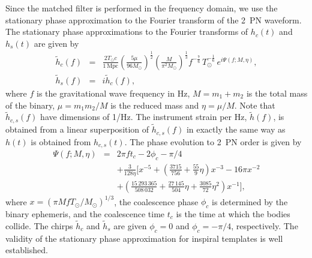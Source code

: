 Since the matched filter is performed in the frequency domain, we use the
stationary phase approximation to the Fourier transform of the 2~PN
waveform\cite{poissonwill}. The stationary phase approximations to the Fourier
transforms of $h_c(t)$ and $h_s(t)$ are given by
\begin{eqnarray}
\label{eq:spcos}
\tilde{h}_c(f)&=&\frac{2T_\odot c}{1\,\mathrm{Mpc}}
\left(\frac{5\mu}{96M_\odot}\right)^\frac{1}{2}
\left(\frac{M}{\pi^2M_\odot}\right)^\frac{1}{3}%
f^{-\frac{7}{6}}\,T_\odot^{-\frac{1}{6}}\,
e^{i\Psi(f;M,\eta)},\\%
\label{eq:hsorthog}
\tilde{h}_s(f)&=&i\tilde{h}_c(f),
\end{eqnarray}
where $f$ is the gravitational wave frequency in Hz, $M = m_1+m_2$ 
is the total mass of the binary, $\mu = m_1 m_2 / M$ is the reduced mass and
$\eta = \mu/M$.  Note that $\tilde{h}_{c,s}(f)$ have dimensions of 1/Hz.  The
instrument strain per Hz, $\tilde{h}(f)$, is obtained from a linear
superposition of $\tilde{h}_{c,s}(f)$ in exactly the same way as $h(t)$ is
obtained from $h_{c,s}(t)$. The phase evolution to 2~PN order is given by
\begin{eqnarray}
\Psi(f;M,\eta)&=&2\pi ft_c-2\phi_c-\pi/4\nonumber\\
&&+\frac{3}{128\eta}\biggl[x^{-5}+
\left(\frac{3715}{756}+\frac{55}{9}\eta\right)x^{-3}
-16\pi x^{-2}\nonumber\\
&&+\left(\frac{15\,293\,365}{508\,032}+\frac{27\,145}{504}\eta
+\frac{3085}{72}\eta^2\right)x^{-1}\nonumber\biggr],
\end{eqnarray}
where $x=(\pi MfT_\odot/M_\odot)^{1/3}$, the coalescence phase
$\phi_c$ is determined by the binary ephemeris, and the coalescence
time $t_c$ is the time at which the bodies collide.  The chirps
$\tilde{h}_c$ and $\tilde{h}_s$ are given $\phi_c=0$ and
$\phi_c=-\pi/4$, respectively. The validity of the stationary phase
approximation for inspiral templates is well established\cite{spvalid}.

